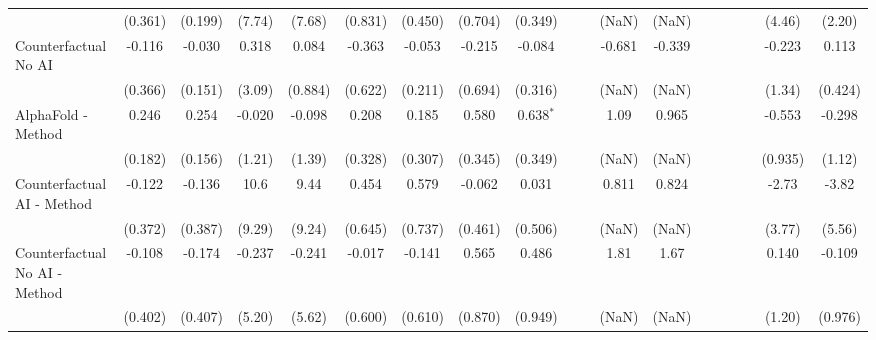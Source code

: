 \begin{tabular}{lcccccccccccccccccc}
                                                              & (0.361)       & (0.199)       & (7.74) & (7.68)  & (0.831)     & (0.450)     & (0.704)     & (0.349)      &     &      & (NaN)  & (NaN)  &      &      &      &      & (4.46)  & (2.20)\\   
   Counterfactual No AI                                       & -0.116        & -0.030        & 0.318  & 0.084   & -0.363      & -0.053      & -0.215      & -0.084       &     &      & -0.681 & -0.339 &      &      &      &      & -0.223  & 0.113\\   
                                                              & (0.366)       & (0.151)       & (3.09) & (0.884) & (0.622)     & (0.211)     & (0.694)     & (0.316)      &     &      & (NaN)  & (NaN)  &      &      &      &      & (1.34)  & (0.424)\\   
   AlphaFold - Method                                         & 0.246         & 0.254         & -0.020 & -0.098  & 0.208       & 0.185       & 0.580       & 0.638$^{*}$  &     &      & 1.09   & 0.965  &      &      &      &      & -0.553  & -0.298\\   
                                                              & (0.182)       & (0.156)       & (1.21) & (1.39)  & (0.328)     & (0.307)     & (0.345)     & (0.349)      &     &      & (NaN)  & (NaN)  &      &      &      &      & (0.935) & (1.12)\\   
   Counterfactual AI - Method                                 & -0.122        & -0.136        & 10.6   & 9.44    & 0.454       & 0.579       & -0.062      & 0.031        &     &      & 0.811  & 0.824  &      &      &      &      & -2.73   & -3.82\\   
                                                              & (0.372)       & (0.387)       & (9.29) & (9.24)  & (0.645)     & (0.737)     & (0.461)     & (0.506)      &     &      & (NaN)  & (NaN)  &      &      &      &      & (3.77)  & (5.56)\\   
   Counterfactual No AI - Method                              & -0.108        & -0.174        & -0.237 & -0.241  & -0.017      & -0.141      & 0.565       & 0.486        &     &      & 1.81   & 1.67   &      &      &      &      & 0.140   & -0.109\\   
                                                              & (0.402)       & (0.407)       & (5.20) & (5.62)  & (0.600)     & (0.610)     & (0.870)     & (0.949)      &     &      & (NaN)  & (NaN)  &      &      &      &      & (1.20)  & (0.976)\\   

\end{tabular}

